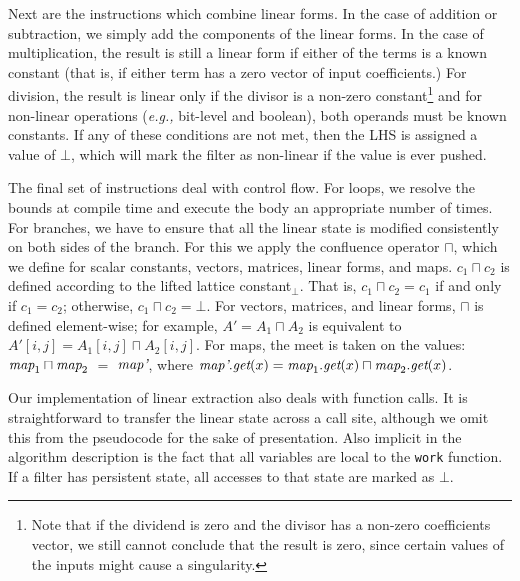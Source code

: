 Next are the instructions which combine linear forms.  In the case of
addition or subtraction, we simply add the components of the linear
forms.  In the case of multiplication, the result is still a linear
form if either of the terms is a known constant (that is, if either
term has a zero vector of input coefficients.)  For division, the
result is linear only if the divisor is a non-zero
constant\footnote{Note that if the dividend is zero and the divisor
has a non-zero coefficients vector, we still cannot conclude that the
result is zero, since certain values of the inputs might cause a
singularity.} and for non-linear operations ({\it e.g.,} bit-level and
boolean), both operands must be known constants.  If any of these
conditions are not met, then the LHS is assigned a value of $\bot$,
which will mark the filter as non-linear if the value is ever pushed.

The final set of instructions deal with control flow.  For loops, we
resolve the bounds at compile time and execute the body an appropriate
number of times.  For branches, we have to ensure that all the linear
state is modified consistently on both sides of the branch.  For this
we apply the confluence operator $\sqcap$, which we define for scalar
constants, vectors, matrices, linear forms, and maps.  $c_1 \sqcap
c_2$ is defined according to the lifted lattice constant$_{\bot}$.
That is, $c_1 \sqcap c_2 = c_1$ if and only if $c_1 = c_2$; otherwise,
$c_1 \sqcap c_2 = \bot$.  For vectors, matrices, and linear forms,
$\sqcap$ is defined element-wise; for example, $A' = A_1 \sqcap A_2$
is equivalent to $A'[i,j] = A_1[i,j] \sqcap A_2[i,j]$.  For maps, the
meet is taken on the values: $\mbox{\it map}_1 \sqcap \mbox{\it map}_2$ $=$
$\mbox{\it map'}$, where $\mbox{\it map'}.\mbox{\it get}(x) = \mbox{\it map}_1.\mbox{\it get}(x)
\sqcap \mbox{\it map}_2.\mbox{\it get}(x)$.

Our implementation of linear extraction also deals with function
calls.  It is straightforward to transfer the linear state across a
call site, although we omit this from the pseudocode for the sake of
presentation.  Also implicit in the algorithm description is the fact
that all variables are local to the {\tt work} function.  If a filter
has persistent state, all accesses to that state are marked as $\bot$.

